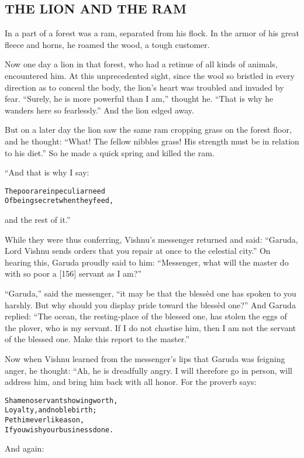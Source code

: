 \documentclass{article}
\renewenvironment{verbatim}{\begin{alltt}\normalfont\begin{centering}}{\end{centering}\end{alltt}}
\begin{document}
\subsection{THE LION AND THE RAM}

In a part of a forest was a ram, separated from his flock. In the
armor of his great fleece and horns, he roamed the wood, a tough
customer.

Now one day a lion in that forest, who had a retinue of all kinds
of animals, encountered him. At this unprecedented sight, since the
wool so bristled in every direction as to conceal the body, the
lion's heart was troubled and invaded by fear.
``Surely, he is more powerful than I am,'' thought he.
``That is why he wanders here so fearlessly.'' And the lion edged
away.

But on a later day the lion saw the same ram cropping grass on the
forest floor, and he thought:
``What! The fellow nibbles grass! His strength must be in relation to his diet.''
So he made a quick spring and killed the ram.

“And that is why I say:

\begin{verbatim}
The poor are in peculiar need
Of being secret when they feed,
\end{verbatim}
and the rest of it.”

While they were thus conferring, Vishnu's messenger returned and
said:
``Garuda, Lord Vishnu sends orders that you repair at once to the celestial city.''
On hearing this, Garuda proudly said to him:
``Messenger, what will the master do with so poor a [156] servant as I am?''

``Garuda,'' said the messenger,
``it may be that the blessèd one has spoken to you harshly. But why should you display pride toward the blessèd one?''
And Garuda replied:
``The ocean, the resting-place of the blessed one, has stolen the eggs of the plover, who is my servant. If I do not chastise him, then I am not the servant of the blessed one. Make this report to the master.''

Now when Vishnu learned from the messenger's lips that Garuda was
feigning anger, he thought: “Ah, he is dreadfully angry. I will
therefore go in person, will address him, and bring him back with
all honor. For the proverb says:

\begin{verbatim}
Shame no servant showing worth,
Loyalty, and noble birth;
Pet him ever like a son,
If you wish your business done.
\end{verbatim}
And again:
\end{document}
